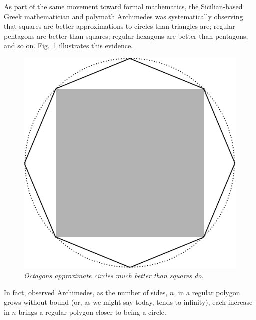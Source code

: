 As part of the same movement toward formal mathematics, the
Sicilian-based Greek mathematician and polymath Archimedes 
was systematically observing that squares are better approximations to
circles than triangles are; regular pentagons are better than squares;
regular hexagons are better than pentagons; and so on.  
Fig.~\ref{fig:approxcircle} illustrates this evidence.
%
\begin{figure}[htb]
\begin{center}
       \includegraphics[scale=0.25]{FiguresArithmetic/ApproxCircle}
\caption{{\it Octagons approximate circles much better than squares do.}
\label{fig:approxcircle}}
\end{center}
\end{figure}
In fact, observed Archimedes, as the number of sides, $n$, in a
regular polygon grows without bound (or, as we might say today, tends
to infinity), each increase in $n$ brings a regular polygon closer to
being a circle.

